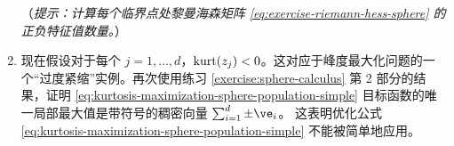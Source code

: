 \documentclass[../../book-main_zh.tex]{subfiles}
\begin{document}
\begin{exercise}
\begin{enumerate}
        （\textit{提示：计算每个临界点处黎曼海森矩阵 \eqref{eq:exercise-riemann-hess-sphere} 的正负特征值数量。}）
        \item 现在假设对于每个 $j =1, \dots, d$，$\mathop{\mathrm{kurt}}(z_j) < 0$。这对应于峰度最大化问题的一个“过度紧缩”实例。再次使用练习 \ref{exercise:sphere-calculus} 第 2 部分的结果，证明 \eqref{eq:kurtosis-maximization-sphere-population-simple} 目标函数的唯一局部最大值是带符号的稠密向量 $\sum_{i=1}^d \pm \ve_i$。
        这表明优化公式 \eqref{eq:kurtosis-maximization-sphere-population-simple} 不能被简单地应用。
    \end{enumerate}
\end{exercise}


\end{document}
